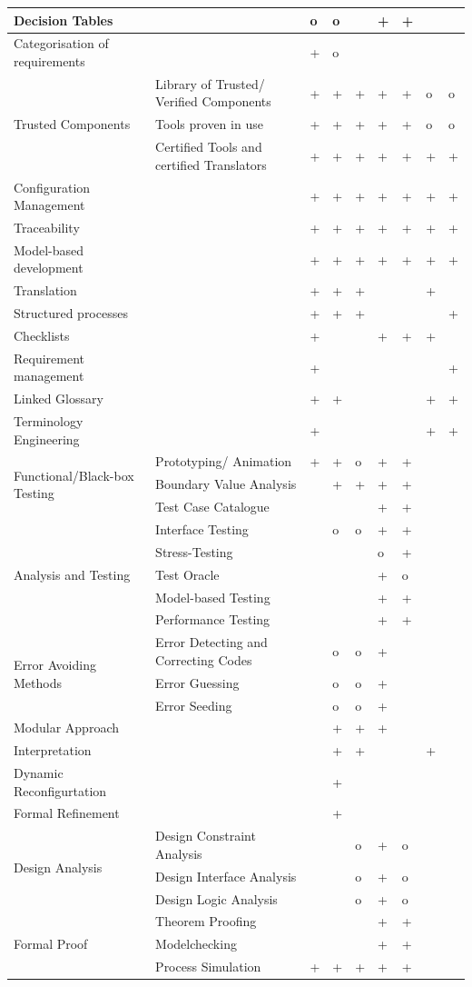 \documentclass{./template/openetcs_report}
\begin{document}
{\begin{longtable}{|m{4cm}|p{3.5cm}|m{0.6cm}|m{0.6cm}|m{0.3cm}|m{0.6cm}|m{0.3cm}|m{0.3cm}|m{0.6cm}|}
Decision Tables & & o & o & & + & + & & \\ \hline
Categorisation of requirements&&+&o&&&&&\\ \hline
\multirow{3}{4cm}{Trusted Components} &Library of Trusted/ Verified Components&+&+&+&+&+&o&o\\ \cline{2-9}
 &Tools proven in use&+&+&+&+&+&o&o\\ \cline{2-9}
 &Certified Tools and certified Translators&+&+&+&+&+&+&+\\ \hline
Configuration Management&&+&+&+&+&+&+&+\\ \hline
Traceability&&+&+&+&+&+&+&+\\ \hline
Model-based development&&+&+&+&+&+&+&+\\ \hline
Translation&&+&+&+&&&+&\\ \hline
Structured processes&&+&+&+&&&&+\\ \hline
Checklists&&+&&&+&+&+&\\ \hline
Requirement management&&+&&&&&&+\\ \hline
Linked Glossary&&+&+&&&&+&+\\ \hline
Terminology Engineering&&+&&&&&+&+\\ \hline
\multirow{3}{4cm}{Functional/Black-box Testing}&Prototyping/ Animation&+&+&o&+&+&&\\ \cline{2-9}
 &Boundary Value Analysis&&+&+&+&+&&\\ \cline{2-9}
 &Test Case Catalogue&&&&+&+&&\\ \hline
\multirow{5}{4cm}{Analysis and Testing}&Interface Testing&&o&o&+&+&&\\ \cline{2-9}
 &Stress-Testing&&&&o&+&&\\ \cline{2-9}
 &Test Oracle&&&&+&o&&\\ \cline{2-9}
 &Model-based Testing&&&&+&+&&\\ \cline{2-9}
 &Performance Testing&&&&+&+&&\\ \hline
\multirow{3}{4cm}{Error Avoiding Methods}&Error Detecting and Correcting Codes&&o&o&+&&&\\ \cline{2-9}
 &Error Guessing&&o&o&+&&&\\ \cline{2-9}
 &Error Seeding&&o&o&+&&&\\ \hline
Modular Approach&&&+&+&+&&&\\ \hline
Interpretation&&&+&+&&&+&\\ \hline
Dynamic Reconfigurtation&&&+&&&&&\\ \hline
Formal Refinement&&&+&&&&&\\ \hline
\multirow{3}{4cm}{Design Analysis}& Design Constraint Analysis&&&o&+&o&&\\ \cline{2-9}
 &Design Interface Analysis&&&o&+&o&&\\ \cline{2-9}
 &Design Logic Analysis&&&o&+&o&&\\ \hline
\multirow{3}{4cm}{Formal Proof}&Theorem Proofing&&&&+&+&&\\ \cline{2-9}
 &Modelchecking&&&&+&+&&\\ \cline{2-9} 
 &Process Simulation&+&+&+&+&+&&\\ \hline


\end{longtable}}
\end{document}
